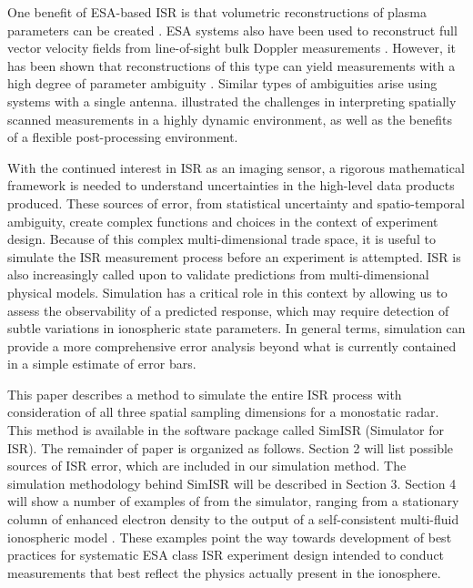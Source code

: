 \documentclass[draft,ras]{agutex}
\begin{document}
\begin{article}
One benefit of ESA-based ISR is that volumetric reconstructions of plasma parameters can be created \citep{Semeter2009738, Nicolls:2007ie, dahlgren2012di}. ESA systems also have been used to reconstruct full vector velocity fields from line-of-sight bulk Doppler measurements \citep{butler:imagingfregiondrifts,RDS:RDS20195}. However, it has been shown that reconstructions of this type can yield measurements with a high degree of parameter ambiguity \citep{Dahlgren:2012dq}. Similar types of ambiguities arise using systems with a single antenna.  \citet{Semeter:2005fo} illustrated the challenges in interpreting spatially scanned measurements in a highly dynamic environment, as well as the benefits of a flexible post-processing environment.

With the continued interest in ISR as an imaging sensor, a rigorous mathematical framework is needed to understand uncertainties in the high-level data products produced.  These sources of error, from statistical uncertainty and spatio-temporal ambiguity, create complex functions and choices in the context of experiment design. Because of this complex multi-dimensional trade space, it is useful to simulate the ISR measurement process before an experiment is attempted.  ISR is also increasingly called upon to validate predictions from multi-dimensional physical models.  Simulation has a critical role in this context by allowing us to assess the observability of a predicted  response, which may require detection of subtle variations in ionospheric state parameters.   In general terms, simulation can provide a more comprehensive error analysis beyond what is currently contained in a simple estimate of error bars. 

This paper describes a method to simulate the entire ISR process with consideration of all three spatial sampling dimensions for a monostatic radar. This method is available in the software package called SimISR (Simulator for ISR).  
The remainder of paper is organized as follows. Section 2 will list possible sources of ISR error, which are included in our simulation method. The simulation methodology behind SimISR will be described in Section 3. Section 4 will show a number of examples of from the simulator, ranging from a stationary column of enhanced electron density to the output of a self-consistent multi-fluid ionospheric model \citep{semeter:plasmatransport2012}. These examples point the way towards development of best practices for systematic ESA class ISR experiment design intended to conduct measurements that best reflect the physics actually present in the ionosphere.

\end{article}
\end{document}
